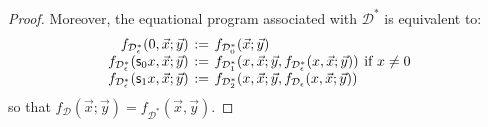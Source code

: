 \documentclass[manuscript,screen]{acmart}
\newcommand{\dfn}{:=}
\newcommand{\red}[1]{{\color{red}#1}}
\newcommand{\blue}[1]{{\color{blue}#1}}
\theoremstyle{definition}
\theoremstyle{remark}
\newcommand{\n}{N}
\newcommand{\sq}{\Box}
\newcommand{\sqn}{{\sq\n}}
\newcommand{\sn}{\sqn}
\renewcommand{\succ}[1]{\mathsf{s}_{#1}}
\newcommand{\cnd}{\mathsf{cond}}
\newcommand{\denot}[1]{f_{#1}}
\newcommand{\hfunction}{\mathcal{H}}
\newcommand{\seqar}{\Rightarrow}
\newcommand{\der}{\mathcal{D}}
\newcommand{\cut}{\mathsf{cut}}
\begin{document}
\begin{proof}
Moreover, the equational program associated with $\der^*$  is equivalent to:
 \[
 \arraycolsep=2pt
    \begin{array}{rcll}
         \denot{\der^*_\epsilon} (0, \vec x;\vec y) & \dfn &  \denot{\der^*_0} (\vec x;\vec y) \\
         \denot{\der^*_\epsilon} (\succ 0 x, \vec x; \vec y) & \dfn & \denot{\der^*_1} (x, \vec x; \vec y, \denot{\der^*_\epsilon}(x, \vec x; \vec y)) & \text{if $x \neq 0$} \\
         \denot{\der^*_\epsilon} (\succ 1 x , \vec x; \vec y) & \dfn & \denot{\der^*_2} (x, \vec x; \vec y,  \denot{\der_\epsilon}(x, \vec x; \vec y)) 
    \end{array}
    \]
so that $\denot\der(\vec x; \vec y)=\denot{\der^*}(\vec x,  \vec y)$.
\end{proof}

\end{document}
